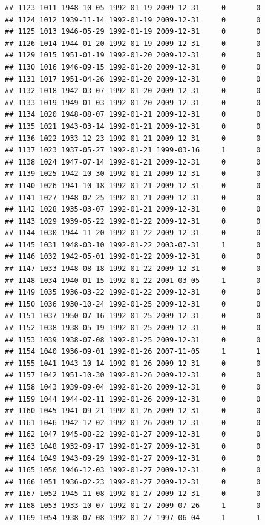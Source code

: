 \documentclass[
]{book}
\theoremstyle{definition}
\theoremstyle{definition}
\theoremstyle{definition}
\theoremstyle{definition}
\theoremstyle{remark}
\begin{document}
\begin{verbatim}
## 1123 1011 1948-10-05 1992-01-19 2009-12-31     0       0
## 1124 1012 1939-11-14 1992-01-19 2009-12-31     0       0
## 1125 1013 1946-05-29 1992-01-19 2009-12-31     0       0
## 1126 1014 1944-01-20 1992-01-19 2009-12-31     0       0
## 1129 1015 1951-01-19 1992-01-20 2009-12-31     0       0
## 1130 1016 1946-09-15 1992-01-20 2009-12-31     0       0
## 1131 1017 1951-04-26 1992-01-20 2009-12-31     0       0
## 1132 1018 1942-03-07 1992-01-20 2009-12-31     0       0
## 1133 1019 1949-01-03 1992-01-20 2009-12-31     0       0
## 1134 1020 1948-08-07 1992-01-21 2009-12-31     0       0
## 1135 1021 1943-03-14 1992-01-21 2009-12-31     0       0
## 1136 1022 1933-12-23 1992-01-21 2009-12-31     0       0
## 1137 1023 1937-05-27 1992-01-21 1999-03-16     1       0
## 1138 1024 1947-07-14 1992-01-21 2009-12-31     0       0
## 1139 1025 1942-10-30 1992-01-21 2009-12-31     0       0
## 1140 1026 1941-10-18 1992-01-21 2009-12-31     0       0
## 1141 1027 1948-02-25 1992-01-21 2009-12-31     0       0
## 1142 1028 1935-03-07 1992-01-21 2009-12-31     0       0
## 1143 1029 1939-05-22 1992-01-22 2009-12-31     0       0
## 1144 1030 1944-11-20 1992-01-22 2009-12-31     0       0
## 1145 1031 1948-03-10 1992-01-22 2003-07-31     1       0
## 1146 1032 1942-05-01 1992-01-22 2009-12-31     0       0
## 1147 1033 1948-08-18 1992-01-22 2009-12-31     0       0
## 1148 1034 1940-01-15 1992-01-22 2001-03-05     1       0
## 1149 1035 1936-03-22 1992-01-22 2009-12-31     0       0
## 1150 1036 1930-10-24 1992-01-25 2009-12-31     0       0
## 1151 1037 1950-07-16 1992-01-25 2009-12-31     0       0
## 1152 1038 1938-05-19 1992-01-25 2009-12-31     0       0
## 1153 1039 1938-07-08 1992-01-25 2009-12-31     0       0
## 1154 1040 1936-09-01 1992-01-26 2007-11-05     1       1
## 1155 1041 1943-10-14 1992-01-26 2009-12-31     0       0
## 1157 1042 1951-10-30 1992-01-26 2009-12-31     0       0
## 1158 1043 1939-09-04 1992-01-26 2009-12-31     0       0
## 1159 1044 1944-02-11 1992-01-26 2009-12-31     0       0
## 1160 1045 1941-09-21 1992-01-26 2009-12-31     0       0
## 1161 1046 1942-12-02 1992-01-26 2009-12-31     0       0
## 1162 1047 1945-08-22 1992-01-27 2009-12-31     0       0
## 1163 1048 1932-09-17 1992-01-27 2009-12-31     0       0
## 1164 1049 1943-09-29 1992-01-27 2009-12-31     0       0
## 1165 1050 1946-12-03 1992-01-27 2009-12-31     0       0
## 1166 1051 1936-02-23 1992-01-27 2009-12-31     0       0
## 1167 1052 1945-11-08 1992-01-27 2009-12-31     0       0
## 1168 1053 1933-10-07 1992-01-27 2009-07-26     1       0
## 1169 1054 1938-07-08 1992-01-27 1997-06-04     1       1

\end{verbatim}
\end{document}
